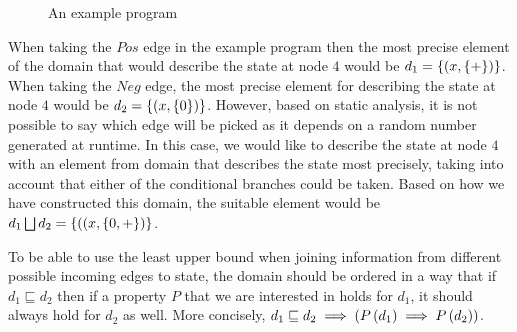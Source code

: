 \documentclass[..thesis.tex]{subfiles}
\begin{document}
\begin{figure}[H]
  \begin{center}
  \end{center}
  \caption{An example program}
\end{figure}


When taking the $Pos$ edge in the example program then the most precise element of the domain that would describe the state at node $4$ would be $d_1 = \left\lbrace \left( x, \left\lbrace + \right\rbrace \right) \right\rbrace$. When taking the $Neg$ edge, the most precise element for describing the state at node $4$ would be $ d_2 = \left\lbrace \left( x, \left\lbrace 0 \right\rbrace \right) \right\rbrace$. However, based on static analysis, it is not possible to say which edge will be picked as it depends on a random number generated at runtime. In this case, we would like to describe the state at node $4$ with an element from domain that describes the state most precisely, taking into account that either of the conditional branches could be taken. Based on how we have constructed this domain, the suitable element would be $d_1 \bigsqcup d_2 = \left\lbrace \left( (x, \left\lbrace 0, + \right\rbrace \right) \right\rbrace$.

To be able to use the least upper bound when joining information from different possible incoming edges to state, the domain should be ordered in a way that if $d_1 \sqsubseteq d_2$ then if a property $P$ that we are interested in holds for $d_1$, it should always hold for $d_2$ as well. More concisely, $d_1 \sqsubseteq d_2 \implies\left(  P \left( d_1 \right) \implies P \left( d_2 \right) \right)$.
\end{document}
